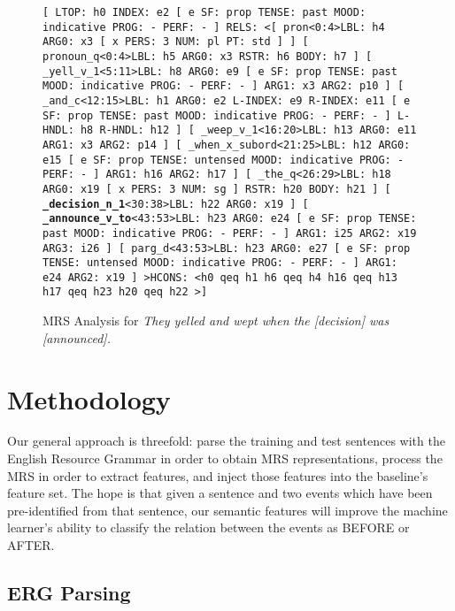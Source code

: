 \documentclass[11pt]{article}
\begin{document}
\begin{figure*}[t]
{\small \texttt{[ LTOP: h0 INDEX: e2 [ e SF: prop TENSE: past MOOD: indicative PROG: - PERF: - ] RELS: \textless [ pron\textless0:4\textgreater LBL: h4 ARG0: x3 [ x PERS: 3 NUM: pl PT: std ] ]  [ pronoun\_q\textless0:4\textgreater LBL: h5 ARG0: x3 RSTR: h6 BODY: h7 ]  [ \_yell\_v\_1\textless5:11\textgreater LBL: h8 ARG0: e9 [ e SF: prop TENSE: past MOOD: indicative PROG: - PERF: - ] ARG1: x3 ARG2: p10 ]  [ \_and\_c\textless12:15\textgreater LBL: h1 ARG0: e2 L-INDEX: e9 R-INDEX: e11 [ e SF: prop TENSE: past MOOD: indicative PROG: - PERF: - ] L-HNDL: h8 R-HNDL: h12 ]  [ \_weep\_v\_1\textless16:20\textgreater LBL: h13 ARG0: e11 ARG1: x3 ARG2: p14 ]  [ \_when\_x\_subord\textless21:25\textgreater LBL: h12 ARG0: e15 [ e SF: prop TENSE: untensed MOOD: indicative PROG: - PERF: - ] ARG1: h16 ARG2: h17 ]  [ \_the\_q\textless26:29\textgreater LBL: h18 ARG0: x19 [ x PERS: 3 NUM: sg ] RSTR: h20 BODY: h21 ]  [ \textbf{\_decision\_n\_1}\textless30:38\textgreater LBL: h22 ARG0: x19 ]  [ \textbf{\_announce\_v\_to}\textless43:53\textgreater LBL: h23 ARG0: e24 [ e SF: prop TENSE: past MOOD: indicative PROG: - PERF: - ] ARG1: i25 ARG2: x19 ARG3: i26 ]  [ parg\_d\textless43:53\textgreater LBL: h23 ARG0: e27 [ e SF: prop TENSE: untensed MOOD: indicative PROG: - PERF: - ] ARG1: e24 ARG2: x19 ] \textgreater HCONS: \textless h0 qeq h1 h6 qeq h4 h16 qeq h13 h17 qeq h23 h20 qeq h22 \textgreater ]}}
\caption{MRS Analysis for \emph{They yelled and wept when the [decision] was [announced].} \label{mrs}}
\end{figure*}

\section{Methodology}
\label{methodology}

Our general approach is threefold: parse the training and test sentences with the English Resource Grammar \cite{Flickinger:00} in order to obtain MRS representations, process the MRS in order to extract features, and inject those features into the baseline's feature set. The hope is that given a sentence and two events which have been pre-identified from that sentence, our semantic features will improve the machine learner's ability to classify the relation between the events as BEFORE or AFTER.


\subsection{ERG Parsing}
\end{document}

